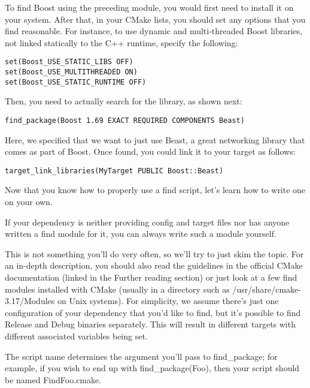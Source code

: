 To find Boost using the preceding module, you would first need to install it on your system. After that, in your CMake lists, you should set any options that you find reasonable. For instance, to use dynamic and multi-threaded Boost libraries, not linked statically to the C++ runtime, specify the following:

\begin{lstlisting}[style=styleCMake]
set(Boost_USE_STATIC_LIBS OFF)
set(Boost_USE_MULTITHREADED ON)
set(Boost_USE_STATIC_RUNTIME OFF)
\end{lstlisting}

Then, you need to actually search for the library, as shown next:

\begin{lstlisting}[style=styleCMake]
find_package(Boost 1.69 EXACT REQUIRED COMPONENTS Beast)
\end{lstlisting}

Here, we specified that we want to just use Beast, a great networking library that comes as part of Boost. Once found, you could link it to your target as follows:

\begin{lstlisting}[style=styleCMake]
target_link_libraries(MyTarget PUBLIC Boost::Beast)
\end{lstlisting}

Now that you know how to properly use a find script, let's learn how to write one on your own.


If your dependency is neither providing config and target files nor has anyone written a find module for it, you can always write such a module yourself.

This is not something you'll do very often, so we'll try to just skim the topic. For an in-depth description, you should also read the guidelines in the official CMake documentation (linked in the Further reading section) or just look at a few find modules installed with CMake (usually in a directory such as /usr/share/cmake-3.17/Modules on Unix systems). For simplicity, we assume there's just one configuration of your dependency that you'd like to find, but it's possible to find Release and Debug binaries separately. This will result in different targets with different associated variables being set.

The script name determines the argument you'll pass to find\_package; for example, if you wish to end up with find\_package(Foo), then your script should be named FindFoo.cmake.

